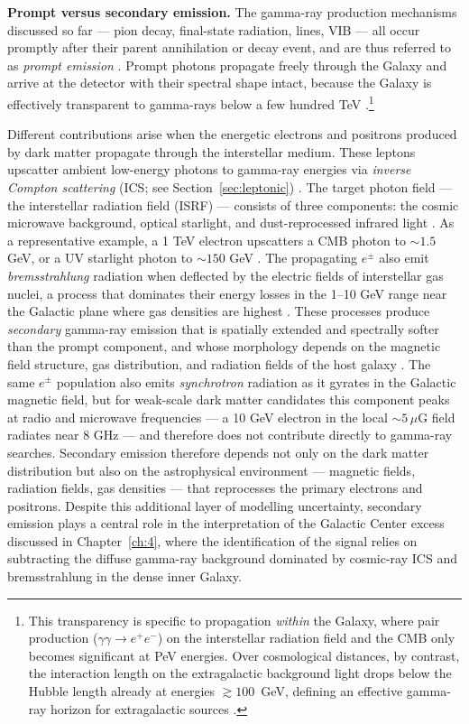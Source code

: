 \textbf{Prompt versus secondary emission.}
The gamma-ray production mechanisms discussed so far --- pion decay, final-state radiation, lines, VIB --- all occur promptly after their parent annihilation or decay event, and are thus referred to as \textit{prompt emission} \cite{Cirelli:2024ssz,Pinetti:2021jjs}.
Prompt photons propagate freely through the Galaxy and arrive at the detector with their spectral shape intact, because the Galaxy is effectively transparent to gamma-rays below a few hundred TeV \cite{Hooper:2024}.\footnote{This transparency is specific to propagation \emph{within} the Galaxy, where pair production ($\gamma\gamma \to e^+e^-$) on the interstellar radiation field and the CMB only becomes significant at PeV energies. Over cosmological distances, by contrast, the interaction length on the extragalactic background light drops below the Hubble length already at energies $\gtrsim 100$~GeV, defining an effective gamma-ray horizon for extragalactic sources \cite{Hooper:2024}.}

Different contributions arise when the energetic electrons and positrons produced by dark matter propagate through the interstellar medium.
These leptons upscatter ambient low-energy photons to gamma-ray energies via \textit{inverse Compton scattering} (ICS; see Section~\ref{sec:leptonic}) \cite{Blumenthal:1970gc}.
The target photon field --- the interstellar radiation field (ISRF) --- consists of three components: the cosmic microwave background, optical starlight, and dust-reprocessed infrared light \cite{Strong:2007nh}.
As a representative example, a 1 TeV electron upscatters a CMB photon to $\sim 1.5$ GeV, or a UV starlight photon to $\sim 150$ GeV \cite{Cirelli:2024ssz}.
The propagating $e^\pm$ also emit \textit{bremsstrahlung} radiation when deflected by the electric fields of interstellar gas nuclei, a process that dominates their energy losses in the 1--10 GeV range near the Galactic plane where gas densities are highest \cite{Blumenthal:1970gc,Dermer:2009zz}.
These processes produce \textit{secondary} gamma-ray emission that is spatially extended and spectrally softer than the prompt component, and whose morphology depends on the magnetic field structure, gas distribution, and radiation fields of the host galaxy \cite{Strong:2007nh}.
The same $e^\pm$ population also emits \textit{synchrotron} radiation as it gyrates in the Galactic magnetic field, but for weak-scale dark matter candidates this component peaks at radio and microwave frequencies --- a 10 GeV electron in the local $\sim 5\,\mu$G field radiates near 8 GHz --- and therefore does not contribute directly to gamma-ray searches.
Secondary emission therefore depends not only on the dark matter distribution but also on the astrophysical environment --- magnetic fields, radiation fields, gas densities --- that reprocesses the primary electrons and positrons.
Despite this additional layer of modelling uncertainty, secondary emission plays a central role in the interpretation of the Galactic Center excess discussed in Chapter~\ref{ch:4}, where the identification of the signal relies on subtracting the diffuse gamma-ray background dominated by cosmic-ray ICS and bremsstrahlung in the dense inner Galaxy.

